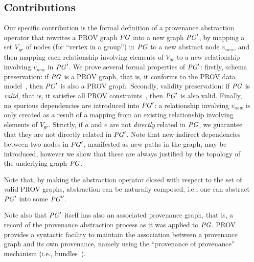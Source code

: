  

 
\subsection{Contributions}
Our specific contribution is the formal definition of a provenance abstraction operator that rewrites  a PROV graph $\mathit{PG}$ into a new graph $\mathit{PG}'$, by mapping a set $V_{gr}$ of nodes (for ``vertex in a group'') in $\mathit{PG}$ to a new abstract node $v_{new}$, and then mapping each relationship involving elements of $V_{gr}$ to a new relationship involving $v_{new}$ in $\mathit{PG}'$.  
We prove several formal properties of $\mathit{PG}'$: firstly, schema preservation: if $\mathit{PG}$ is a PROV graph, that is, it conforms to the PROV data model~\citep{w3c-prov-dm}, then $\mathit{PG}'$ is also a PROV graph. Secondly, validity preservation: if $\mathit{PG}$ is \textit{valid}, that is, it satisfies all PROV constraints~\citep{w3c-prov-dm}, then $\mathit{PG}'$ is also valid. Finally, no spurious dependencies are introduced into $\mathit{PG}'$: a  relationship involving $v_{new}$ is only created as a result of a mapping from an existing relationship involving elements of $V_{gr}$. Strictly, if $a$ and $e$ are not \textit{directly} related in $\mathit{PG}$, we guarantee that they are not directly related in $\mathit{PG}'$. 
Note that new indirect dependencies between two nodes in $\mathit{PG}'$, manifested as new paths in the graph, may be introduced, however we show that these are always justified by the topology of the underlying graph $\mathit{PG}$.

Note that, by making the abstraction operator closed with respect to the set of valid PROV graphs, abstraction can be naturally composed, i.e., one can abstract $\mathit{PG}'$ into some $\mathit{PG}''$.

Note also that $\mathit{PG}'$ itself has also an associated provenance graph, that is, a record of the provenance abstraction process as it was applied to $\mathit{PG}$. 
PROV provides a syntactic facility to maintain the association between a provenance graph and its own provenance, namely using the ``provenance of provenance'' mechanism (i.e., bundles~\citep{w3c-prov-dm}).
